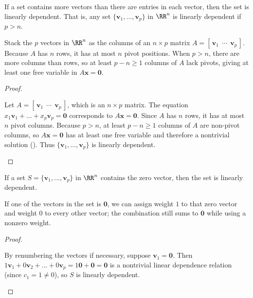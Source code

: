 \documentclass[10pt]{scrartcl}
\newcommand{\vv}[1]{\mathbf{#1}}
\begin{document}
\begin{theorem*}
  If a set contains more vectors than there are entries in each vector, then the set is linearly dependent. That is, any set $\{\vv v_1,\dots,\vv v_p\}$ in $\RR^n$ is linearly dependent if $p>n$.
\end{theorem*}
\begin{ideabox}
  Stack the $p$ vectors in $\RR^n$ as the columns of an $n\times p$ matrix $A=[\,\vv v_1\ \ \cdots\ \ \vv v_p\,]$. Because $A$ has $n$ rows, it has at most $n$ pivot positions. When $p>n$, there are more columns than rows, so at least $p-n\ge 1$ columns of $A$ lack pivots, giving at least one free variable in $A\vv x=\vv 0$.
\end{ideabox}
\begin{proof}
  \begin{steps}
    \ii Let $A=[\,\vv v_1\ \ \cdots\ \ \vv v_p\,]$, which is an $n\times p$ matrix. The equation $x_1\vv v_1+\dots+x_p\vv v_p=\vv 0$ corresponds to $A\vv x=\vv 0$.
    \ii Since $A$ has $n$ rows, it has at most $n$ pivot columns. Because $p>n$, at least $p-n\ge 1$ columns of $A$ are non-pivot columns, so $A\vv x=\vv 0$ has at least one free variable and therefore a nontrivial solution (). Thus $\{\vv v_1,\dots,\vv v_p\}$ is linearly dependent.
  \end{steps}
\end{proof}

\begin{theorem*}
  If a set $S=\{\vv v_1,\dots,\vv v_p\}$ in $\RR^n$ contains the zero vector, then the set is linearly dependent.
\end{theorem*}
\begin{ideabox}
  If one of the vectors in the set is $\vv 0$, we can assign weight $1$ to that zero vector and weight $0$ to every other vector; the combination still sums to $\vv 0$ while using a nonzero weight.
\end{ideabox}
\begin{proof}
  \begin{steps}
    \ii By renumbering the vectors if necessary, suppose $\vv v_1=\vv 0$. Then $1\vv v_1+0\vv v_2+\dots+0\vv v_p=1\vv 0+\vv 0=\vv 0$ is a nontrivial linear dependence relation (since $c_1=1\ne 0$), so $S$ is linearly dependent.
  \end{steps}
\end{proof}
\end{document}
